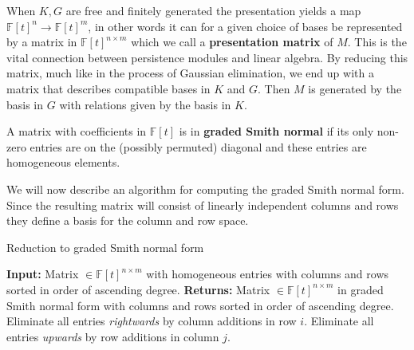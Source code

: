 When $K,G$ are free and finitely generated the presentation yields a map $\mathbb{F}[t]^{n} \to \mathbb{F}[t]^{m}$, in other words it can for a given choice of bases be represented by a matrix in $\mathbb{F}[t]^{n \times m}$ which we call a \textbf{presentation matrix} of $M$. This is the vital connection between persistence modules and linear algebra. By reducing this matrix, much like in the process of Gaussian elimination, we end up with a matrix that describes compatible bases in $K$ and $G$. Then $M$ is generated by the basis in $G$ with relations given by the basis in $K$.

\begin{definition}
A matrix with coefficients in $\mathbb{F}[t]$ is in \textbf{graded Smith normal} if its only non-zero entries are on the (possibly permuted) diagonal and these entries are homogeneous elements.
\end{definition}

We will now describe an algorithm for computing the graded Smith normal form. Since the resulting matrix will consist of linearly independent columns and rows they define a basis for the column and row space.
\clearpage
\begin{algorithm}[h]
\caption{Reduction to graded Smith normal form \cite{skraba, Zomorodian2005}}\label{smith}
\begin{algorithmic}[1]
  \State \textbf{Input:} Matrix $ \in \mathbb{F}[t]^{n \times m}$ with homogeneous entries with columns and rows sorted in order of ascending degree.
  \State \textbf{Returns:} Matrix $ \in \mathbb{F}[t]^{n \times m}$ in graded Smith normal form with columns and rows sorted in order of ascending degree.
  \State Eliminate all entries \textit{rightwards} by column additions in row $i$.
  \State Eliminate all entries \textit{upwards} by row additions in column $j$.
  \EndFor
\end{algorithmic}
\end{algorithm}

